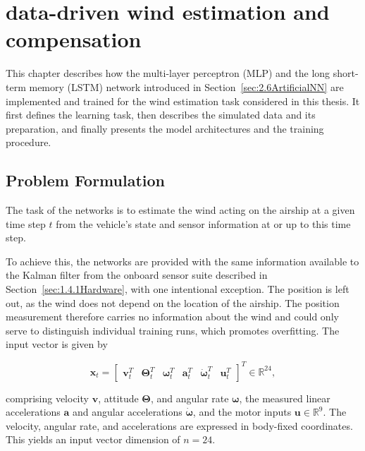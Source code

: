\chapter{data-driven wind estimation and compensation}
\label{chap:4.DataDriven}

This chapter describes how the multi-layer perceptron (MLP) and the long short-term memory (LSTM) network introduced in Section~\ref{sec:2.6ArtificialNN} are implemented and trained for the wind estimation task considered in this thesis. It first defines the learning task, then describes the simulated data and its preparation, and finally presents the model architectures and the training procedure.





\section{Problem Formulation}
\label{sec:4.1ProblemFormulation}

The task of the networks is to estimate the wind acting on the airship at a given time step $t$ from the vehicle's state and sensor information at or up to this time step.

To achieve this, the networks are provided with the same information available to the Kalman filter from the onboard sensor suite described in Section~\ref{sec:1.4.1Hardware}, with one intentional exception. The position is left out, as the wind does not depend on the location of the airship. The position measurement therefore carries no information about the wind and could only serve to distinguish individual training runs, which promotes overfitting. The input vector is given by

\begin{equation}
	\bm{x}_t = \begin{bmatrix} \bm{v}_t^T & \bm{\Theta}_t^T & \bm{\omega}_t^T & \bm{a}_t^T & \bm{\dot{\omega}}_t^T & \bm{u}_t^T \end{bmatrix}^T \in \mathbb{R}^{24},
	\label{eq:nn_input}
\end{equation}

comprising velocity $\bm{v}$, attitude $\bm{\Theta}$, and angular rate $\bm{\omega}$, the measured linear accelerations $\bm{a}$ and angular accelerations $\bm{\dot{\omega}}$, and the motor inputs $\bm{u} \in \mathbb{R}^{9}$.
The velocity, angular rate, and accelerations are expressed in body-fixed coordinates. This yields an input vector dimension of $n = 24$.

